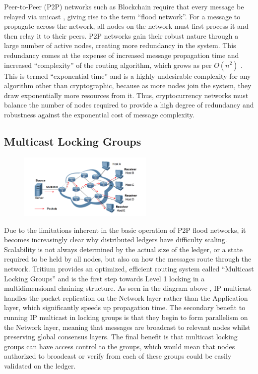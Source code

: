 \documentclass[11pt]{article}
\begin{document}
Peer-to-Peer (P2P) networks such as Blockchain require that every message be relayed via unicast \cite{Flood_Networks}, giving rise to the term ``flood network''.
For a message to propagate across the network, all nodes on the network must first process it and then relay it to their peers.
P2P networks gain their robust nature through a large number of active nodes, creating more redundancy in the system.
This redundancy comes at the expense of increased message propagation time and increased ``complexity'' of the routing algorithm, which grows as per $O(n^2)$ \cite{Big_O_Notation}.
This is termed ``exponential time'' and is a highly undesirable complexity for any algorithm other than cryptographic, because as more nodes join the system, they draw exponentially more resources from it.
Thus, cryptocurrency networks must balance the number of nodes required to provide a high degree of redundancy and robustness against the exponential cost of message complexity.

\subsection{Multicast Locking Groups}

\begin{figure}
    \centering
    \vspace{-15pt}
    \hspace{0pt}
    \includegraphics[width=0.58\textwidth]{./images/rsz_multicast.png}
\end{figure}

Due to the limitations inherent in the basic operation of P2P flood networks, it becomes increasingly clear why distributed ledgers have difficulty scaling.
Scalability is not always determined by the actual size of the ledger, or a state required to be held by all nodes, but also on how the messages route through the network.
Tritium provides an optimized, efficient routing system called ``Multicast Locking Groups'' and is the first step towards Level 1 locking in a multidimensional chaining structure.
As seen in the diagram above \cite{Multicast}, IP multicast handles the packet replication on the Network layer rather than the Application layer, which significantly speeds up propagation time.
The secondary benefit to running IP multicast in locking groups is that they begin to form parallelism on the Network layer, meaning that messages are broadcast to relevant nodes whilst preserving global consensus layers.
The final benefit is that multicast locking groups can have access control to the groups, which would mean that nodes authorized to broadcast or verify from each of these groups could be easily validated on the ledger.
\end{document}
